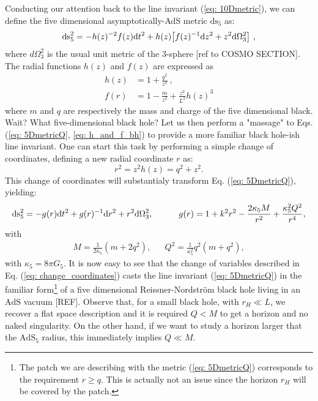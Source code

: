 Conducting our attention back to the line invariant (\ref{eq: 10Dmetric}), we can define the five dimensional asymptotically-AdS metric $\text{ds}_{5}$ as:
\begin{equation}\label{eq: 5DmetricQ}
  \text{ds}_{5}^{2} = - h(z)^{-2} f(z) \text{d} t^{2}
        + h(z) \big[ f(z)^{-1} \text{d} z^{2} + z^{2} \text{d} \Omega_{3}^{2} \big] \ ,
\end{equation}
where $d\Omega_{3}^2$ is the usual unit metric of the 3-sphere [ref to COSMO SECTION]. The radial functions $h(z)$ and $f(z)$ are expressed as
\begin{equation}\label{eq: h_and_f_bh}
    \begin{split}
        h(z)&=1+\frac{q^{2}}{z^{2}} \ , \\
 f(r) &= 1 - \frac{m}{z^{2}} + \frac{z^{2}}{L^{2}} h(z)^{3}
    \end{split}
\end{equation}
where $m$ and $q$ are respectively the mass and charge of the five dimensional black. Wait? What five-dimensional black hole? Let us then perform a "massage" to Eqs. (\ref{eq: 5DmetricQ}, \ref{eq: h_and_f_bh}) to provide a more familiar black hole-ish line invariant. One can start this task by performing a simple change of coordinates, defining a new radial coordinate $r$ as:
\begin{equation}\label{eq: change_coordinates}
    r^{2} = z^{2}h(z) = q^{2} + z^{2} .
\end{equation}
This change of coordinates will substantialy transform Eq. (\ref{eq: 5DmetricQ}), yielding:
\begin{equation}\label{eq: metricargument}
    \text{ds}_{5}^{2} = -g(r) \text{d} t^{2} + g(r)^{-1} \text{d} r^{2}+r^{2} \text{d} \Omega_{3}^{2}, \qquad \quad g(r) = 1 + k^{2}r^{2}- \frac{2\kappa_{5} M}{r^{2}} + \frac{\kappa_{5}^{2} Q^{2}}{r^{4}}, 
\end{equation}
with 
\begin{align}\label{eq: identifications_MQ}
    M = \frac{1}{2\kappa_5}\left(m + 2q^2\right), &&  Q^2 = \frac{1}{\kappa_5^2}q^2(m+q^2),
\end{align}
with $\kappa_5 = 8\pi G_5$. It is now easy to see that the change of variables described in Eq. (\ref{eq: change_coordinates}) casts the line invariant (\ref{eq: 5DmetricQ}) in the familiar form\footnote{The patch we are describing with the metric (\ref{eq: 5DmetricQ}) corresponds to the requirement $r\geqslant q$. This is actually not an issue since the  horizon $r_{H}$ will be covered by the patch.} of a five dimensional Reissner-Nordström black hole living in an $\text{AdS}$ vacuum [REF]. Observe that, for a small black hole, with $r_{H} \ll L$, we recover a flat space description and it is required $Q<M$ to get a horizon and no naked singularity. On the other hand, if we want to study a horizon larger that the $\text{AdS}_{5}$ radius, this immediately implies $Q\ll M$.

